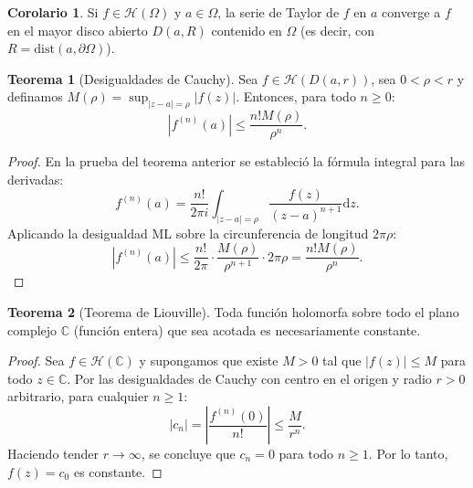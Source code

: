 \documentclass[11pt,a4paper]{article}
\theoremstyle{definition}
\newtheorem{teorema}{Teorema}[section]
\newtheorem{corolario}{Corolario}[section]
\theoremstyle{remark}
\numberwithin{equation}{section}
\newcommand{\dz}{\mathrm{d}z}
\begin{document}
\begin{corolario}
Si $f \in \mathcal{H}(\Omega)$ y $a \in \Omega$, la serie de Taylor de $f$ en $a$ converge a $f$ en el mayor disco abierto $D(a, R)$ contenido en $\Omega$ (es decir, con $R = \mathrm{dist}(a, \partial \Omega)$).
\end{corolario}

\begin{teorema}[Desigualdades de Cauchy]
Sea $f \in \mathcal{H}(D(a,r))$, sea $0 < \rho < r$ y definamos $M(\rho) = \sup_{|z-a|=\rho} |f(z)|$. Entonces, para todo $n \ge 0$:
\begin{equation}
|f^{(n)}(a)| \le \frac{n! M(\rho)}{\rho^n}.
\end{equation}
\end{teorema}
\begin{proof}
En la prueba del teorema anterior se estableció la fórmula integral para las derivadas:
\[
f^{(n)}(a) = \frac{n!}{2\pi i} \int_{|z-a|=\rho} \frac{f(z)}{(z-a)^{n+1}} \dz.
\]
Aplicando la desigualdad ML sobre la circunferencia de longitud $2\pi \rho$:
\[
|f^{(n)}(a)| \le \frac{n!}{2\pi} \cdot \frac{M(\rho)}{\rho^{n+1}} \cdot 2\pi \rho = \frac{n! M(\rho)}{\rho^n}.
\]
\end{proof}

\begin{teorema}[Teorema de Liouville]
Toda función holomorfa sobre todo el plano complejo $\mathbb{C}$ (función entera) que sea acotada es necesariamente constante.
\end{teorema}
\begin{proof}
Sea $f \in \mathcal{H}(\mathbb{C})$ y supongamos que existe $M > 0$ tal que $|f(z)| \le M$ para todo $z \in \mathbb{C}$. Por las desigualdades de Cauchy con centro en el origen y radio $r > 0$ arbitrario, para cualquier $n \ge 1$:
\[
|c_n| = \left| \frac{f^{(n)}(0)}{n!} \right| \le \frac{M}{r^n}.
\]
Haciendo tender $r \to \infty$, se concluye que $c_n = 0$ para todo $n \ge 1$. Por lo tanto, $f(z) = c_0$ es constante.
\end{proof}
\end{document}
